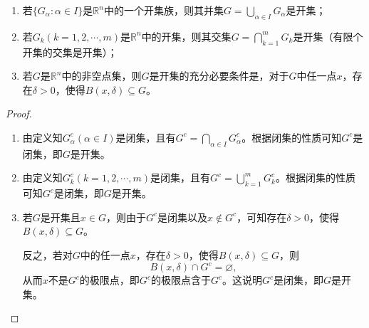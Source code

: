 \documentclass[../../main.tex]{subfiles}%
\begin{document}
\begin{theorem}[开集的基本性质]\label{theorem:开集的运算性质}
\begin{enumerate}[(1)]
\item 若\(\{G_{\alpha}:\alpha\in I\}\)是\(\mathbb{R}^n\)中的一个开集族，则其并集\(G = \bigcup_{\alpha\in I}G_{\alpha}\)是开集；

\item 若\(G_k(k = 1,2,\cdots,m)\)是\(\mathbb{R}^n\)中的开集，则其交集\(G=\bigcap_{k = 1}^{m}G_k\)是开集（有限个开集的交集是开集）；

\item 若\(G\)是\(\mathbb{R}^n\)中的非空点集，则\(G\)是开集的充分必要条件是，对于\(G\)中任一点\(x\)，存在\(\delta>0\)，使得\(B(x,\delta)\subseteq G\)。
\end{enumerate}
\end{theorem}
\begin{proof}
\begin{enumerate}[(1)]
\item 由定义知\(G_{\alpha}^c(\alpha\in I)\)是闭集，且有\(G^c=\bigcap_{\alpha\in I}G_{\alpha}^c\)。根据闭集的性质可知\(G^c\)是闭集，即\(G\)是开集。

\item 由定义知\(G_k^c(k = 1,2,\cdots,m)\)是闭集，且有\(G^c=\bigcup_{k = 1}^{m}G_k^c\)。根据闭集的性质可知\(G^c\)是闭集，即\(G\)是开集。

\item 若\(G\)是开集且\(x\in G\)，则由于\(G^c\)是闭集以及\(x\notin G^c\)，可知存在\(\delta>0\)，使得\(B(x,\delta)\subseteq G\)。

反之，若对\(G\)中的任一点\(x\)，存在\(\delta>0\)，使得\(B(x,\delta)\subseteq G\)，则
\[B(x,\delta)\cap G^c=\varnothing,\]
从而\(x\)不是\(G^c\)的极限点，即\(G^c\)的极限点含于\(G^c\)。这说明\(G^c\)是闭集，即\(G\)是开集。
\end{enumerate}
\end{proof}
\end{document}
